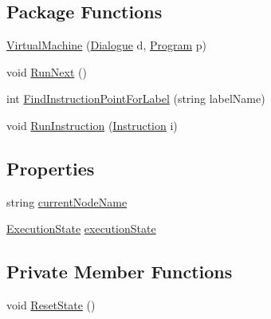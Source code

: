 \subsection*{Package Functions}
\begin{DoxyCompactItemize}
\item 
\hyperlink{a00138_aefa64c4353e5c261f1189649638e49a6}{Virtual\-Machine} (\hyperlink{a00072}{Dialogue} d, \hyperlink{a00126}{Program} p)
\item 
void \hyperlink{a00138_af3cc0337914b9f66454a3d52208dba5f}{Run\-Next} ()
\item 
int \hyperlink{a00138_af613c8b2d098678b6ea05b509c0a0cb6}{Find\-Instruction\-Point\-For\-Label} (string label\-Name)
\item 
void \hyperlink{a00138_ad2caf9ca4f00cdcbd58983be7c106971}{Run\-Instruction} (\hyperlink{a00095}{Instruction} i)
\end{DoxyCompactItemize}
\subsection*{Properties}
\begin{DoxyCompactItemize}
\item 
string \hyperlink{a00138_ab3afe8360a344c16c21213edb3641481}{current\-Node\-Name}
\item 
\hyperlink{a00138_add28fa9c8a45ca579e84d05920bbc42d}{Execution\-State} \hyperlink{a00138_a66491da06023dabfb63d09e6ccbba74f}{execution\-State}
\end{DoxyCompactItemize}
\subsection*{Private Member Functions}
\begin{DoxyCompactItemize}
\item 
void \hyperlink{a00138_a3ba945c66cb8ba031357a1771453f82b}{Reset\-State} ()
\end{DoxyCompactItemize}
